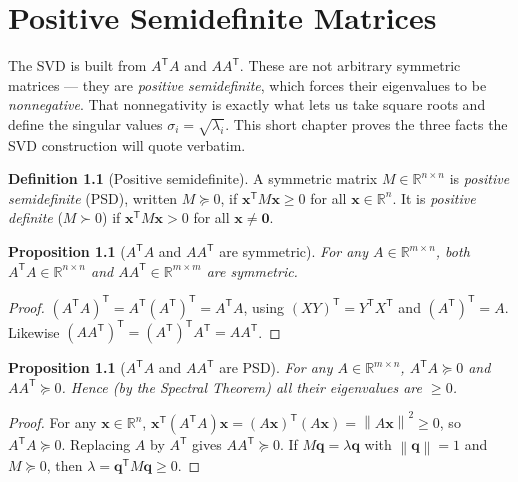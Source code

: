 \documentclass[11pt,oneside]{book}
\theoremstyle{plain}
\newtheorem{proposition}[theorem]{Proposition}
\theoremstyle{definition}
\newtheorem{definition}[theorem]{Definition}
\theoremstyle{remark}
\newcommand{\R}{\mathbb{R}}
\newcommand{\norm}[1]{\left\lVert #1 \right\rVert}
\newcommand{\T}{^{\mathsf T}}
\newcommand{\bx}{\mathbf{x}}
\newcommand{\bq}{\mathbf{q}}
\newcommand{\bzero}{\mathbf{0}}
\begin{document}
\chapter{Positive Semidefinite Matrices}\label{ch:psd}

\begin{intuition_box}
The SVD is built from $A\T A$ and $AA\T$. These are not arbitrary symmetric matrices ---
they are \emph{positive semidefinite}, which forces their eigenvalues to be
\emph{nonnegative}. That nonnegativity is exactly what lets us take square roots and
define the singular values $\sigma_i=\sqrt{\lambda_i}$. This short chapter proves the
three facts the SVD construction will quote verbatim.
\end{intuition_box}

\begin{definition}[Positive semidefinite]
A symmetric matrix $M\in\R^{n\times n}$ is \emph{positive semidefinite} (PSD), written
$M\succeq0$, if $\bx\T M\bx\ge0$ for all $\bx\in\R^n$. It is \emph{positive definite}
($M\succ0$) if $\bx\T M\bx>0$ for all $\bx\ne\bzero$.
\end{definition}

\begin{proposition}[$A\T A$ and $AA\T$ are symmetric]\label{prop:gramsym}
For any $A\in\R^{m\times n}$, both $A\T A\in\R^{n\times n}$ and $AA\T\in\R^{m\times m}$
are symmetric.
\end{proposition}
\begin{proof}
$(A\T A)\T=A\T(A\T)\T=A\T A$, using $(XY)\T=Y\T X\T$ and $(A\T)\T=A$. Likewise
$(AA\T)\T=(A\T)\T A\T=AA\T$.
\end{proof}

\begin{proposition}[$A\T A$ and $AA\T$ are PSD]\label{prop:grampsd}
For any $A\in\R^{m\times n}$, $A\T A\succeq0$ and $AA\T\succeq0$. Hence (by the Spectral
Theorem) all their eigenvalues are $\ge0$.
\end{proposition}
\begin{proof}
For any $\bx\in\R^n$, $\bx\T(A\T A)\bx=(A\bx)\T(A\bx)=\norm{A\bx}^2\ge0$, so
$A\T A\succeq0$. Replacing $A$ by $A\T$ gives $AA\T\succeq0$. If $M\bq=\lambda\bq$ with
$\norm{\bq}=1$ and $M\succeq0$, then $\lambda=\bq\T M\bq\ge0$.
\end{proof}
\end{document}

